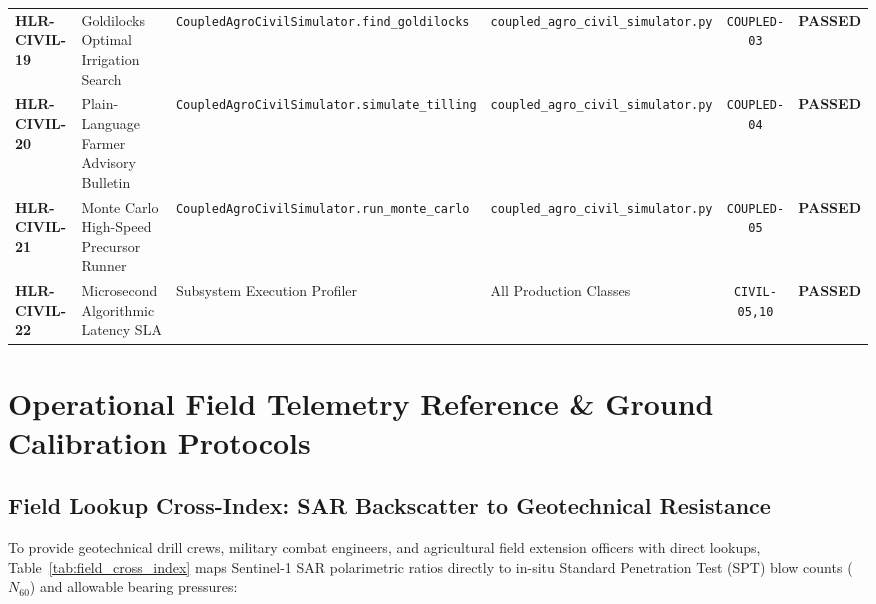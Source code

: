 \documentclass[11pt,a4paper]{article}
\theoremstyle{definition}
\theoremstyle{remark}
\begin{document}
\begin{table}[htbp]
\begin{tabular}{lp{4.2cm}lp{2.8cm}cc}
\textbf{HLR-CIVIL-19} & Goldilocks Optimal Irrigation Search & \texttt{CoupledAgroCivilSimulator.find\_goldilocks} & \texttt{coupled\_agro\_civil\_simulator.py} & \texttt{COUPLED-03} & \textbf{PASSED} \\
\textbf{HLR-CIVIL-20} & Plain-Language Farmer Advisory Bulletin & \texttt{CoupledAgroCivilSimulator.simulate\_tilling} & \texttt{coupled\_agro\_civil\_simulator.py} & \texttt{COUPLED-04} & \textbf{PASSED} \\
\textbf{HLR-CIVIL-21} & Monte Carlo High-Speed Precursor Runner & \texttt{CoupledAgroCivilSimulator.run\_monte\_carlo} & \texttt{coupled\_agro\_civil\_simulator.py} & \texttt{COUPLED-05} & \textbf{PASSED} \\
\textbf{HLR-CIVIL-22} & Microsecond Algorithmic Latency SLA & Subsystem Execution Profiler & All Production Classes & \texttt{CIVIL-05,10} & \textbf{PASSED} \\
\bottomrule
\end{tabular}
\label{tab:traceability_matrix}
\end{table}


\section{Operational Field Telemetry Reference \& Ground Calibration Protocols}

\subsection{Field Lookup Cross-Index: SAR Backscatter to Geotechnical Resistance}
To provide geotechnical drill crews, military combat engineers, and agricultural field extension officers with direct lookups, Table~\ref{tab:field_cross_index} maps Sentinel-1 SAR polarimetric ratios directly to in-situ Standard Penetration Test (SPT) blow counts ($N_{60}$) and allowable bearing pressures:
\end{document}
